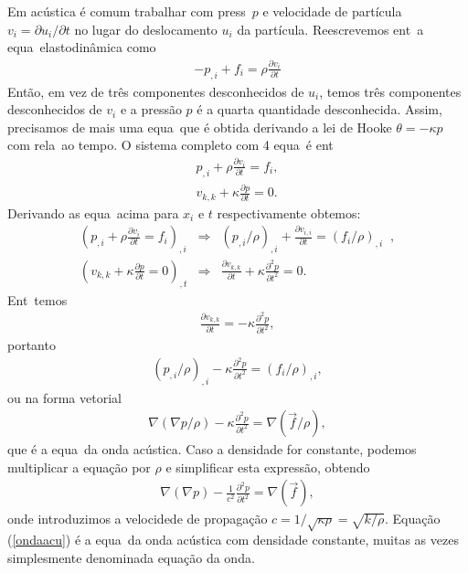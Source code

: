 Em ac\'ustica \'e comum trabalhar com press\ao\ $p$ e velocidade de
part\'icula $v_i = \partial u_i/\partial t$ no lugar do deslocamento
$u_i$ da part\'icula. Reescrevemos ent\ao\ a equa\cao\ elastodin\^amica
como
\begin{eqnarray}
-p_{,i} + f_i = \rho\frac{\partial v_i}{\partial t}
\end{eqnarray}
Ent\~ao, em vez de tr\^es componentes desconhecidos de $u_i$,
temos tr\^es componentes desconhecidos de $v_i$ e a press\~ao
$p$ \'e a quarta
quantidade desconhecida. Assim, precisamos de mais uma equa\cao\ que
\'e obtida derivando a lei de Hooke $\theta = -\kappa p$ com rela\cao\
ao tempo. O sistema completo com 4 equa\coes\ \'e ent\ao
\begin{eqnarray}
p_{,i} + \rho\frac{\partial v_i}{\partial t} = f_i,
\label{eqondpres} \\
v_{k,k} + \kappa\frac{\partial p}{\partial t} = 0 .
\label{eqondvel}
\end{eqnarray}
Derivando as equa\coes\ acima para $x_i$ e $t$ respectivamente obtemos:
\begin{eqnarray}
(p_{,i} + \rho\frac{\partial v_i}{\partial t} = f_i)_{,i} &\Rightarrow& 
(p_{,i}/\rho)_{,i} + \frac{\partial v_{i,i}}{\partial t} = (f_i/\rho)_{,i} \;\; , \\
(v_{k,k} + \kappa\frac{\partial p}{\partial t} = 0)_{,t} &\Rightarrow&
\frac{\partial v_{k,k}}{\partial t} + \kappa\frac{\partial^2 p}{\partial t^2} = 0.
\end{eqnarray}
Ent\ao\ temos
\begin{eqnarray}
\frac{\partial v_{k,k}}{\partial t} = -\kappa\frac{\partial^2 p}{\partial t^2},
\end{eqnarray}
portanto
\begin{eqnarray}
(p_{,i}/\rho)_{,i} - \kappa\frac{\partial^2 p}{\partial t^2} = (f_i/\rho)_{,i},
\end{eqnarray}
ou na forma vetorial
\begin{eqnarray}
\nabla(\nabla p/\rho) - \kappa\frac{\partial^2 p}{\partial t^2} = \nabla(\vec{f}/\rho),
\end{eqnarray}
que \'e a equa\cao\ da onda ac\'ustica.
Caso a densidade for constante, podemos multiplicar a equa\c{c}\~ao por
$\rho$ e simplificar esta express\~ao, 
obtendo
\begin{eqnarray}
\nabla(\nabla p) - \frac{1}{c^2}\frac{\partial^2 p}{\partial t^2} = \nabla(\vec{f}),
\label{ondaacu}
\end{eqnarray}
onde introduzimos a velocidede de propaga\c{c}\~ao
$c=1/\sqrt{\kappa\rho}=\sqrt{k/\rho}$. Equa\c{c}\~ao (\ref{ondaacu})
\'e a equa\cao\ da onda ac\'ustica com densidade constante, muitas
as vezes simplesmente denominada equa\c{c}\~ao da onda.
%
